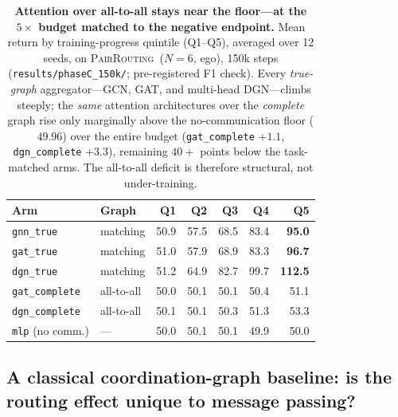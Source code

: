 \documentclass[10pt]{article}
\makeatletter
\newcommand{\pairrouting}{\textsc{PairRouting}}
\newcommand{\SCkMlp}{49.96}           %
\makeatother
\begin{document}
\begin{table}[t]
  \centering
  \caption{\textbf{Attention over all-to-all stays near the floor---at the
  $5\times$ budget matched to the negative endpoint.} Mean return by
  training-progress quintile (Q1--Q5), averaged over 12 seeds, on
  \pairrouting\ ($N{=}6$, ego), 150k steps (\texttt{results/phaseC\_150k/};
  pre-registered F1 check). Every \emph{true-graph} aggregator---GCN, GAT, and
  multi-head DGN---climbs steeply; the \emph{same} attention architectures
  over the \emph{complete} graph rise only marginally above the no-communication
  floor ($\SCkMlp$) over the entire budget (\texttt{gat\_complete} $+1.1$,
  \texttt{dgn\_complete} $+3.3$), remaining $40+$ points below the task-matched
  arms. The all-to-all deficit is therefore structural, not under-training.}
  \label{tab:attn150k}
  \small
  \begin{tabular}{llrrrrr}
    \toprule
    Arm & Graph & Q1 & Q2 & Q3 & Q4 & Q5 \\
    \midrule
    \texttt{gnn\_true}      & matching   & 50.9 & 57.5 & 68.5 & 83.4 & \textbf{95.0} \\
    \texttt{gat\_true}      & matching   & 51.0 & 57.9 & 68.9 & 83.3 & \textbf{96.7} \\
    \texttt{dgn\_true}      & matching   & 51.2 & 64.9 & 82.7 & 99.7 & \textbf{112.5} \\
    \addlinespace
    \texttt{gat\_complete}  & all-to-all & 50.0 & 50.1 & 50.1 & 50.4 & 51.1 \\
    \texttt{dgn\_complete}  & all-to-all & 50.1 & 50.1 & 50.3 & 51.3 & 53.3 \\
    \texttt{mlp} (no comm.) & ---        & 50.0 & 50.1 & 50.1 & 49.9 & 50.0 \\
    \bottomrule
  \end{tabular}
\end{table}

\subsection{A classical coordination-graph baseline: is the routing effect unique to message passing?}
\label{sec:structure:classical}
\end{document}
